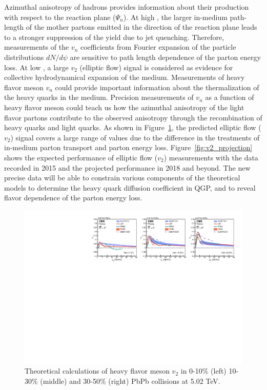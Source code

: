 Azimuthal anisotropy of hadrons provides information about their production with respect to the reaction plane ($\Psi_n$). At high \pt, the larger in-medium path-length of the mother partons emitted in the direction of the reaction plane leads to a stronger suppression of the yield due to jet quenching. Therefore, measurements of the $v_n$ coefficients from Fourier expansion of the particle distributions $dN/d\psi$ are sensitive to path length dependence of the parton energy loss. At low \pt, a large $v_2$ (elliptic flow) signal is considered as evidence for collective hydrodynamical expansion of the medium. Measurements of heavy flavor meson $v_n$ could provide important information about the thermalization of the heavy quarks in the medium. Precision measurements of $v_n$ as a function of heavy flavor meson \pt could teach us how the azimuthal anisotropy of the light flavor partons contribute to the observed anisotropy through the recombination of heavy quarks and light quarks. As shown in Figure~\ref{fig:v2_theory}, the predicted elliptic flow ($v_2$) signal covers a large range of values due to the difference in the treatments of in-medium parton transport and parton energy loss. Figure~\ref{fig:v2_projection} shows the expected performance of elliptic flow ($v_2$) measurements with the data recorded in 2015 and the projected performance in 2018 and beyond. The new precise data will be able to constrain various components of the theoretical models to determine the heavy quark diffusion coefficient in QGP, and to reveal flavor dependence of the parton energy loss.


\begin{figure}[!ht]
\begin{center}
\includegraphics[width=.98\textwidth]{figures/cTheoryV2_D_v1.pdf}
\caption{Theoretical calculations of heavy flavor meson $v_2$ in 0-10\% (left) 10-30\% (middle) and 30-50\% (right) PbPb collisions at 5.02 TeV.}
\label{fig:v2_theory}
\end{center}
\end{figure}

